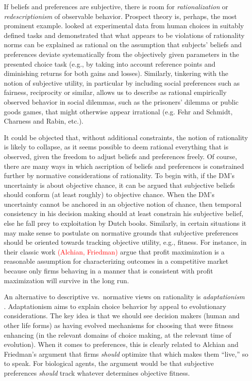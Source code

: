 \documentclass[fleqn,reqno,11pt]{article}
\newcommand{\myalert}[1]{\textcolor{red}{#1}}
\begin{document}
If beliefs and preferences are subjective, there is room for \emph{rationalization} or
\emph{redescriptionism} of observable behavior. Prospect theory is, perhaps, the most prominent
example. \citet{KahnemannTversky1979:Prospect-Theory} looked at experimental data from human
choices in suitably defined tasks and demonstrated that what appears to be violations of
rationality norms can be explained as rational on the assumption that subjects' beliefs and
preferences deviate systematically from the objectively given parameters in the presented
choice task (e.g., by taking into account reference points and diminishing returns for both
gains and losses).  Similarly, tinkering with the notion of subjective utility, in particular
by including social preferences such as fairness, reciprocity or similar, allows us to describe
as rational empirically observed behavior in social dilemmas, such as the prisoners' dilemma or
public goods games, that might otherwise appear irrational (e.g. Fehr and Schmidt, Charness and
Rabin, etc.).

It could be objected that, without additional constraints, the notion of rationality is likely
to collapse, as it seems possible to deem rational everything that is observed, given the
freedom to adjust beliefs and preferences freely. Of course, there are many ways in which
ascription of beliefs and preferences is constrained further by normative considerations of
rationality.  To begin with, if the DM's uncertainty is
about objective chance, it can be argued that subjective beliefs should conform (at least
roughly) to objective chance. When the DM's uncertainty cannot be anchored in an objective
notion of chance, then temporal consistency in his decision making should at least constrain
his subjective belief, else he fall prey to exploitation by Dutch books. Similarly, in certain
situations it may make sense to postulate on normative grounds that subjective preferences
should be oriented towards tracking objective utility, e.g., fitness. For instance, in their
classic work \myalert{(Alchian, Friedman)} argue that profit maximization is a reasonable
assumption for characterizing outcomes in a competitive market because only firms behaving in a
manner that is consistent with profit maximization will survive in the long run.

An alternative to descriptive vs.~normative views on rationality is \emph{adaptationism}
\citep[e.g.][]{HagenChater2012:Decision-Making}.  Adaptationism aims to
explain choice behavior by appeal to evolutionary considerations. The key idea is that we
should see decision makers (human and other life forms) as having evolved mechanisms for
choosing that were fitness enhancing (in the relevant domains of choice making, at the relevant
time of evolution). When it comes to preferences, this is clearly related to Alchian and
Friedman's argument that firms \emph{should} optimize that which makes them ``live,'' so to
speak. For biological agents, the argument would be that subjective preferences \emph{should}
track whatever determines objective fitness.
\end{document}
